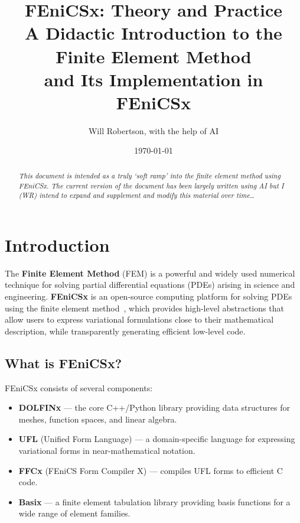 \documentclass[11pt]{article}
\title{%
  \textbf{FEniCSx: Theory and Practice}\\[0.4em]
  \large A Didactic Introduction to the Finite Element Method\\
  and Its Implementation in FEniCSx
}
\author{Will Robertson, with the help of AI}
\date{\today}
\begin{document}
\maketitle
\begin{abstract}
\em
This document is intended as a truly `soft ramp' into the finite element method
using FEniCSx.
The current version of the document has been largely written using AI but I (WR)
intend to expand and supplement and modify this material over time\dots
\end{abstract}
\tableofcontents
\newpage

\section{Introduction}
\label{sec:introduction}

The \textbf{Finite Element Method} (FEM) is a powerful and
widely used numerical technique for solving partial differential equations
(PDEs) arising in science and engineering.
\textbf{FEniCSx} is an open-source computing platform for solving PDEs
using the finite element method~\cite{LoggMardalWells2012, Scroggs2022}, which
provides high-level abstractions that allow users to express variational
formulations close to their mathematical description, while transparently
generating efficient low-level code.

\subsection{What is FEniCSx?}

FEniCSx consists of several components:
\begin{itemize}
  \item \textbf{DOLFINx} --- the core C++/Python library providing data
    structures for meshes, function spaces, and linear algebra.
  \item \textbf{UFL} (Unified Form Language) --- a domain-specific language
    for expressing variational forms in near-mathematical notation.
  \item \textbf{FFCx} (FEniCS Form Compiler X) --- compiles UFL forms to
    efficient C code.
  \item \textbf{Basix} --- a finite element tabulation library providing
    basis functions for a wide range of element families.
\end{itemize}
\end{document}
